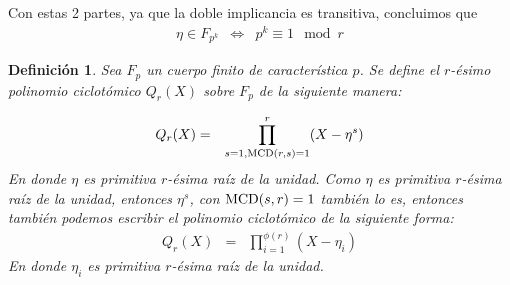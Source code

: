 \documentclass[10pt]{article}
\newcommand{\0}{\mathbf{0}}
\newcommand{\1}{\mathbf{1}}
\newcommand{\modl}{\mod}
\newcommand{\MCD}{{\rm MCD}}
\newcommand{\+}{\oplus}
\newcommand{\comentario}[1]{}
\newcommand{\comentarioin}[1]{}
\newtheorem{definition}[theorem]{Definición}
\theoremstyle{remark}
\theoremstyle{remark}
\begin{document}
	Con estas 2 partes, ya que la doble implicancia es transitiva, concluimos que 
	\begin{eqnarray}
		\eta \in F_{p^k} &\Leftrightarrow& p^k\equiv 1 \modl r\label{eq:propiedad}
	\end{eqnarray}	 
	
	\begin{definition}%
		Sea $F_p$ un cuerpo finito de caracterí­stica $p$. Se define el $r$-ésimo polinomio ciclotómico $Q_r(X)$ sobre $F_p$ de la siguiente manera:
		\comentarioin{Es posible que este polinomio no se pueda representar en este cuerpo?}
		\begin{eqnarray}
			Q_r(X) &=& \prod_{s=1,\MCD(r,s)=1}^{r}(X-\eta^s)\nonumber
		\end{eqnarray}
		En donde $\eta$ es primitiva $r$-ésima raí­z de la unidad. 
		Como $\eta$ es primitiva $r$-ésima raí­z de la unidad, entonces $\eta^s$, con $\MCD(s,r)=1$ también lo es, entonces también podemos escribir el polinomio ciclotómico de la siguiente forma: 
		\begin{eqnarray}
			Q_r(X) &=& \prod_{i=1}^{\phi (r)}(X-\eta_i)\nonumber
		\end{eqnarray}
		En donde $\eta_i$ es primitiva $r$-ésima raí­z de la unidad.
	\end{definition} 	
		
\end{document}
